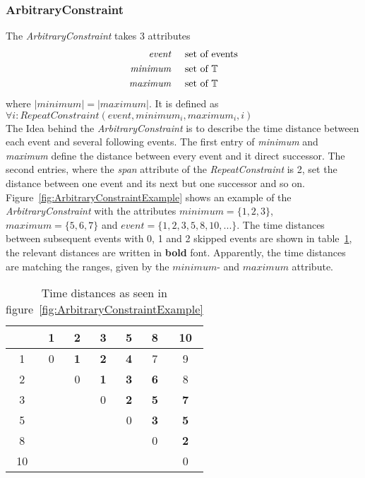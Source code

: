 	\subsubsection{ArbitraryConstraint}
		The \emph{ArbitraryConstraint} takes 3 attributes
		\begin{align*}
			\emph{event} 	& \hspace{.5cm}\text{set of events}\\
			\emph{minimum}	& \hspace{.5cm}\text{set of }\mathbb{T}\\
			\emph{maximum}	& \hspace{.5cm}\text{set of }\mathbb{T}
		\end{align*}
		where $|minimum|=|maximum|$. It is defined as \\[10pt]
		\begin{math}
			\forall i: RepeatConstraint(event, minimum_i, maximum_i, i)
		\end{math}\\[10pt]
		The Idea behind the \emph{ArbitraryConstraint} is to describe the time distance between each event and several following events. The first entry of \emph{minimum} and \emph{maximum} define the distance between every event and it direct successor. The second entries, where the \emph{span} attribute of the  \emph{RepeatConstraint} is 2, set the distance between one event and its next but one successor and so on.\\
		Figure~\ref{fig:ArbitraryConstraintExample} shows an example of the \emph{ArbitraryConstraint} with the attributes $minimum=\{1,2,3\}$, $maximum=\{5,6,7\}$ and $event=\{1, 2, 3, 5, 8, 10, ...\}$. The time distances between subsequent events with 0, 1 and 2 skipped events are shown in table~\ref{tab:ArbitraryConstraintExampleTable}, the relevant distances are written in \textbf{bold} font. Apparently, the time distances are matching the ranges, given by the $minimum$- and $maximum$ attribute.\\
		\begin{table}
			\begin{tabular}{|c|c|c|c|c|c|c|}
				\hline
				& 1 & 2 & 3 & 5 & 8 & 10 \\
				\hline
				1 & 0 & \textbf{1} & \textbf{2} & \textbf{4} & 7 & 9 \\
				\hline
				2 &  & 0 & \textbf{1} & \textbf{3} & \textbf{6} & 8 \\
				\hline
				3 &  &  & 0 & \textbf{2} & \textbf{5} & \textbf{7} \\
				\hline
				5 &  &  &  & 0 & \textbf{3} & \textbf{5} \\
				\hline
				8 &  &  &  &  & 0 & \textbf{2} \\
				\hline
				10 &  &  &  &  &  & 0 \\
				\hline
			\end{tabular}
			\centering
			\caption{Time distances as seen in figure~\ref{fig:ArbitraryConstraintExample}}
			\label{tab:ArbitraryConstraintExampleTable}
		\end{table}

